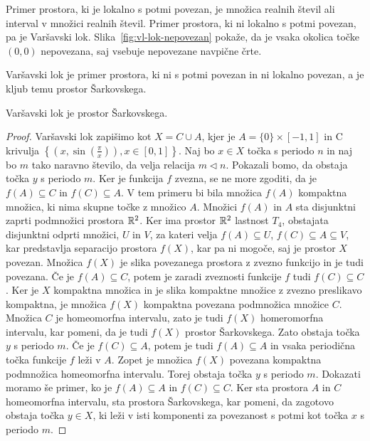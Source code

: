 \documentclass[../TG_magistrsko_delo_sections.tex]{subfiles}
\begin{document}
Primer prostora, ki je lokalno s potmi povezan, je množica realnih števil ali interval v množici realnih števil. Primer prostora, ki ni lokalno s potmi povezan, pa je Varšavski lok. Slika~\ref{fig:vl-lok-nepovezan} pokaže, da je vsaka okolica točke $(0, 0)$ nepovezana, saj vsebuje nepovezane navpične črte.

Varšavski lok je primer prostora, ki ni s potmi povezan in ni lokalno povezan, a je kljub temu prostor Šarkovskega.


\begin{trditev}
Varšavski lok je prostor Šarkovskega.
\end{trditev}
\begin{proof}
Varšavski lok zapišimo kot $X = C \cup A$, kjer je $A= \{0\} \times [-1, 1]$ in C krivulja $\left\{\left(x, \sin\left(\frac{\pi}{x}\right)\right), x\in [0, 1]\right\}$. Naj bo $x \in X$ točka s periodo $n$ in naj bo $m$ tako naravno število, da velja relacija $m \triangleleft n$. Pokazali bomo, da obstaja točka $y$ s periodo $m$. Ker je funkcija $f$ zvezna, se ne more zgoditi, da je $f(A) \subseteq C$ in $f(C) \subseteq A$. V tem primeru bi bila množica $f(A)$ kompaktna množica, ki nima skupne točke z množico $A$. Množici $f(A)$ in $A$ sta disjunktni zaprti podmnožici prostora $\mathbb R^2$. Ker ima prostor $\mathbb R^2$ lastnost $T_4$, obstajata disjunktni odprti množici, $U$ in $V$, za kateri velja $f(A) \subseteq U$, $f(C) \subseteq A \subseteq V$, kar predstavlja separacijo prostora $f(X)$, kar pa ni mogoče, saj je prostor $X$ povezan. Množica $f(X)$ je slika povezanega prostora z zvezno funkcijo in je tudi povezana. Če je $f(A) \subseteq C$, potem je zaradi zveznosti funkcije $f$ tudi $f(C) \subseteq C$. Ker je $X$ kompaktna množica in je slika kompaktne množice z zvezno preslikavo kompaktna, je množica $f(X)$ kompaktna povezana podmnožica množice $C$. Množica $C$ je homeomorfna intervalu, zato je tudi $f(X)$ homeromorfna intervalu, kar pomeni, da je tudi $f(X)$ prostor Šarkovskega. Zato obstaja točka $y$ s periodo $m$. Če je $f (C) \subseteq A $, potem je tudi $f (A) \subseteq A $ in vsaka periodična točka funkcije $f$ leži v $A$.  Zopet je množica $f(X)$ povezana kompaktna podmnožica homeomorfna intervalu. Torej obstaja točka $y$ s periodo $m$. 
Dokazati moramo še primer, ko je $f (A) \subseteq A $ in $f (C) \subseteq C $. Ker sta prostora $A$ in $C$ homeomorfna intervalu, sta prostora Šarkovskega, kar pomeni, da zagotovo obstaja točka $y \in X$, ki leži v isti komponenti za povezanost s potmi kot točka $x$ s periodo $m$.
\end{proof}
\end{document}
